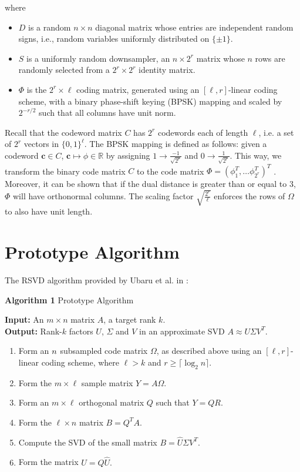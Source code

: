 \documentclass[12pt]{article}
\newcommand{\tbf}{\textbf}
\newcommand{\mB}{\mathbb}
\begin{document}
where 
\begin{itemize}
\item $D$ is a random $n \times n$ diagonal matrix whose entries are independent random signs, i.e., random variables uniformly distributed on $\{ \pm 1 \}$.

\item $S$ is a uniformly random downsampler, an $n \times 2^r$ matrix whose $n$ rows are randomly selected from a $2^r \times 2^r$ identity matrix.

\item $\Phi$ is the $2^r \times \ell$ coding matrix, generated using an $[ \ell, r]$-linear coding scheme, with a binary phase-shift keying (BPSK) mapping and scaled by $2^{-r/2}$ such that all columns have unit norm.

\end{itemize}
Recall that the codeword matrix $C$ has $2^r$ codewords each of length $\ell$, i.e. a set of $2^r$ vectors in $\{0,1\}^{\ell}$. The BPSK mapping is defined as follows: given a codeword $\tbf{c} \in C$, $\tbf{c} \mapsto \phi \in \mB{R}$ by assigning $1 \rightarrow \frac{-1}{\sqrt{2^r}}$ and $0 \rightarrow \frac{1}{\sqrt{2^r}}$. This way, we transform the binary code matrix $C$ to the code matrix $\Phi = (\phi_1^T,  \hdots \phi_{2^r}^T) ^T$ \cite{ubaru2015low}. Moreover, it can be shown that if the dual distance is greater than or equal to 3, $\Phi$ will have orthonormal columns. The scaling factor $\sqrt{\frac{2^r}{\ell}}$ enforces the rows of $\Omega$ to also have unit length.


\section{Prototype Algorithm}
The RSVD algorithm provided by Ubaru et al. in \cite{ubaru2015low} :

\textbf{Algorithm 1} Prototype Algorithm \\
\vspace{4mm}

\textbf{Input:} An $m \times n$ matrix $A$, a target rank $k$. \\
\textbf{Output:} Rank-$k$ factors $U$, $\Sigma$ and $V$ in an approximate SVD $A \approx U \Sigma V^T$. 

\begin{enumerate}
 \item Form an $n \time \ell$ subsampled code matrix $\Omega$, as described above using an $[\ell,r]$-linear coding scheme, where $\ell > k$ and $r \ge \lceil \log_2 n \rceil.$ 

 \item Form the $m \times \ell$ sample matrix $Y = A\Omega$.
 \item Form an $m \times \ell$ orthogonal matrix $Q$ such that $Y = QR$. 
\item Form the $\ell \times n$ matrix $B = Q^T A$.
\item Compute the SVD of the small matrix $B = \hat{U} \Sigma V^T$.
\item Form the matrix $U = Q \hat{U}.$
\end{enumerate}
\end{document}
